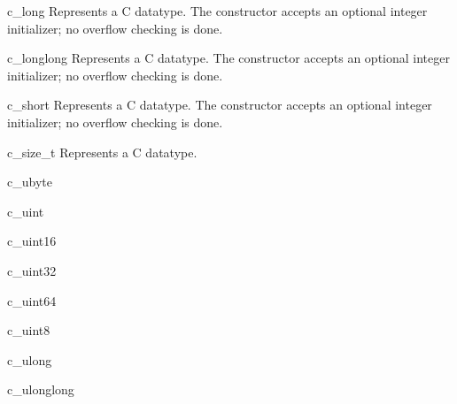 \begin{classdesc}{c_long}{}
Represents a C  datatype.  The constructor accepts
an optional integer initializer; no overflow checking is done.
\end{classdesc}

\begin{classdesc}{c_longlong}{}
Represents a C  datatype.  The constructor
accepts an optional integer initializer; no overflow checking is done.
\end{classdesc}

\begin{classdesc}{c_short}{}
Represents a C  datatype.  The constructor accepts
an optional integer initializer; no overflow checking is done.
\end{classdesc}

\begin{classdesc}{c_size_t}{}
Represents a C  datatype.
\end{classdesc}

\begin{classdesc}{c_ubyte}{}
\end{classdesc}

\begin{classdesc}{c_uint}{}
\end{classdesc}

\begin{classdesc}{c_uint16}{}
\end{classdesc}

\begin{classdesc}{c_uint32}{}
\end{classdesc}

\begin{classdesc}{c_uint64}{}
\end{classdesc}

\begin{classdesc}{c_uint8}{}
\end{classdesc}

\begin{classdesc}{c_ulong}{}
\end{classdesc}

\begin{classdesc}{c_ulonglong}{}
\end{classdesc}

